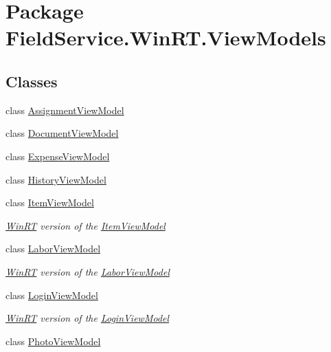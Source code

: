 \hypertarget{namespace_field_service_1_1_win_r_t_1_1_view_models}{\section{Package Field\+Service.\+Win\+R\+T.\+View\+Models}
\label{namespace_field_service_1_1_win_r_t_1_1_view_models}
}
\subsection*{Classes}
\begin{DoxyCompactItemize}
\item 
class \hyperlink{class_field_service_1_1_win_r_t_1_1_view_models_1_1_assignment_view_model}{Assignment\+View\+Model}
\item 
class \hyperlink{class_field_service_1_1_win_r_t_1_1_view_models_1_1_document_view_model}{Document\+View\+Model}
\item 
class \hyperlink{class_field_service_1_1_win_r_t_1_1_view_models_1_1_expense_view_model}{Expense\+View\+Model}
\item 
class \hyperlink{class_field_service_1_1_win_r_t_1_1_view_models_1_1_history_view_model}{History\+View\+Model}
\item 
class \hyperlink{class_field_service_1_1_win_r_t_1_1_view_models_1_1_item_view_model}{Item\+View\+Model}
\begin{DoxyCompactList}\small\item\em \hyperlink{namespace_field_service_1_1_win_r_t}{Win\+R\+T} version of the \hyperlink{class_field_service_1_1_win_r_t_1_1_view_models_1_1_item_view_model}{Item\+View\+Model} \end{DoxyCompactList}\item 
class \hyperlink{class_field_service_1_1_win_r_t_1_1_view_models_1_1_labor_view_model}{Labor\+View\+Model}
\begin{DoxyCompactList}\small\item\em \hyperlink{namespace_field_service_1_1_win_r_t}{Win\+R\+T} version of the \hyperlink{class_field_service_1_1_win_r_t_1_1_view_models_1_1_labor_view_model}{Labor\+View\+Model} \end{DoxyCompactList}\item 
class \hyperlink{class_field_service_1_1_win_r_t_1_1_view_models_1_1_login_view_model}{Login\+View\+Model}
\begin{DoxyCompactList}\small\item\em \hyperlink{namespace_field_service_1_1_win_r_t}{Win\+R\+T} version of the \hyperlink{class_field_service_1_1_win_r_t_1_1_view_models_1_1_login_view_model}{Login\+View\+Model} \end{DoxyCompactList}\item 
class \hyperlink{class_field_service_1_1_win_r_t_1_1_view_models_1_1_photo_view_model}{Photo\+View\+Model}
\end{DoxyCompactItemize}
